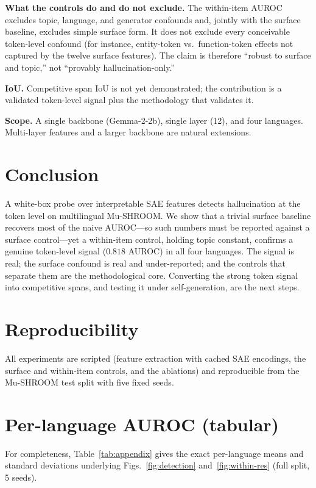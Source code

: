 \documentclass[conference]{IEEEtran}
\begin{document}
\textbf{What the controls do and do not exclude.} The within-item AUROC
excludes topic, language, and generator confounds and, jointly with the surface
baseline, excludes simple surface form. It does not exclude every conceivable
token-level confound (for instance, entity-token vs.\ function-token effects
not captured by the twelve surface features). The claim is therefore
``robust to surface and topic,'' not ``provably hallucination-only.''

\textbf{IoU.} Competitive span IoU is not yet demonstrated; the contribution is
a validated token-level signal plus the methodology that validates it.

\textbf{Scope.} A single backbone (Gemma-2-2b), single layer (12), and four
languages. Multi-layer features and a larger backbone are natural extensions.

\section{Conclusion}
A white-box probe over interpretable SAE features detects hallucination at the
token level on multilingual Mu-SHROOM. We show that a trivial surface baseline
recovers most of the naive AUROC---so such numbers must be reported against a
surface control---yet a within-item control, holding topic constant, confirms a
genuine token-level signal ($0.818$ AUROC) in all four languages. The signal is
real; the surface confound is real and under-reported; and the controls that
separate them are the methodological core. Converting the strong token signal
into competitive spans, and testing it under self-generation, are the next
steps.

\section*{Reproducibility}
All experiments are scripted (feature extraction with cached SAE encodings,
the surface and within-item controls, and the ablations) and reproducible from
the Mu-SHROOM test split with five fixed seeds.

\appendices
\section{Per-language AUROC (tabular)}
For completeness, Table~\ref{tab:appendix} gives the exact per-language means
and standard deviations underlying Figs.~\ref{fig:detection}
and~\ref{fig:within-res} (full split, 5 seeds).
\end{document}
